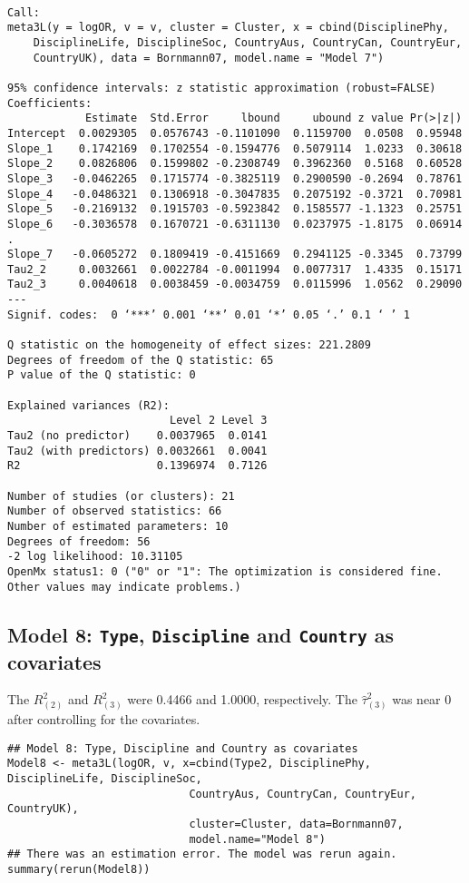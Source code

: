 \documentclass[11pt]{article}
\begin{document}
\begin{verbatim}

Call:
meta3L(y = logOR, v = v, cluster = Cluster, x = cbind(DisciplinePhy, 
    DisciplineLife, DisciplineSoc, CountryAus, CountryCan, CountryEur, 
    CountryUK), data = Bornmann07, model.name = "Model 7")

95% confidence intervals: z statistic approximation (robust=FALSE)
Coefficients:
            Estimate  Std.Error     lbound     ubound z value Pr(>|z|)  
Intercept  0.0029305  0.0576743 -0.1101090  0.1159700  0.0508  0.95948  
Slope_1    0.1742169  0.1702554 -0.1594776  0.5079114  1.0233  0.30618  
Slope_2    0.0826806  0.1599802 -0.2308749  0.3962360  0.5168  0.60528  
Slope_3   -0.0462265  0.1715774 -0.3825119  0.2900590 -0.2694  0.78761  
Slope_4   -0.0486321  0.1306918 -0.3047835  0.2075192 -0.3721  0.70981  
Slope_5   -0.2169132  0.1915703 -0.5923842  0.1585577 -1.1323  0.25751  
Slope_6   -0.3036578  0.1670721 -0.6311130  0.0237975 -1.8175  0.06914 .
Slope_7   -0.0605272  0.1809419 -0.4151669  0.2941125 -0.3345  0.73799  
Tau2_2     0.0032661  0.0022784 -0.0011994  0.0077317  1.4335  0.15171  
Tau2_3     0.0040618  0.0038459 -0.0034759  0.0115996  1.0562  0.29090  
---
Signif. codes:  0 ‘***’ 0.001 ‘**’ 0.01 ‘*’ 0.05 ‘.’ 0.1 ‘ ’ 1

Q statistic on the homogeneity of effect sizes: 221.2809
Degrees of freedom of the Q statistic: 65
P value of the Q statistic: 0

Explained variances (R2):
                         Level 2 Level 3
Tau2 (no predictor)    0.0037965  0.0141
Tau2 (with predictors) 0.0032661  0.0041
R2                     0.1396974  0.7126

Number of studies (or clusters): 21
Number of observed statistics: 66
Number of estimated parameters: 10
Degrees of freedom: 56
-2 log likelihood: 10.31105 
OpenMx status1: 0 ("0" or "1": The optimization is considered fine.
Other values may indicate problems.)
\end{verbatim}

\subsection{Model 8: \texttt{Type}, \texttt{Discipline} and \texttt{Country} as covariates}
\label{sec:org0f15ece}
The \(R^2_{(2)}\) and \(R^2_{(3)}\) were 0.4466 and 1.0000, respectively. The \(\hat{\tau}^2_{(3)}\) was near 0 after controlling for the covariates. 

\begin{verbatim}
## Model 8: Type, Discipline and Country as covariates
Model8 <- meta3L(logOR, v, x=cbind(Type2, DisciplinePhy, DisciplineLife, DisciplineSoc,
                            CountryAus, CountryCan, CountryEur, CountryUK), 
                            cluster=Cluster, data=Bornmann07,
                            model.name="Model 8") 
## There was an estimation error. The model was rerun again.
summary(rerun(Model8))
\end{verbatim}
\end{document}
